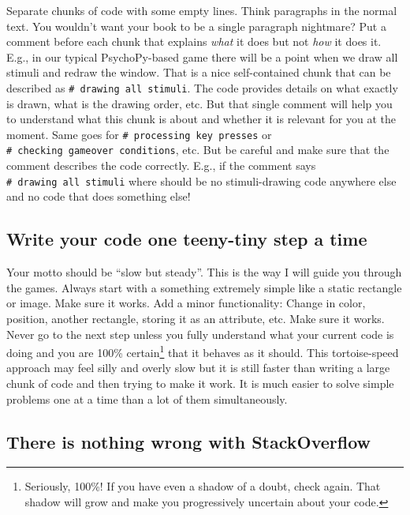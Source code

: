 \documentclass[
]{book}
\begin{document}
Separate chunks of code with some empty lines. Think paragraphs in the normal text. You wouldn't want your book to be a single paragraph nightmare? Put a comment before each chunk that explains \emph{what} it does but not \emph{how} it does it. E.g., in our typical PsychoPy-based game there will be a point when we draw all stimuli and redraw the window. That is a nice self-contained chunk that can be described as \texttt{\#\ drawing\ all\ stimuli}. The code provides details on what exactly is drawn, what is the drawing order, etc. But that single comment will help you to understand what this chunk is about and whether it is relevant for you at the moment. Same goes for \texttt{\#\ processing\ key\ presses} or \texttt{\#\ checking\ gameover\ conditions}, etc. But be careful and make sure that the comment describes the code correctly. E.g., if the comment says \texttt{\#\ drawing\ all\ stimuli} where should be no stimuli-drawing code anywhere else and no code that does something else!

\hypertarget{write-your-code-one-teeny-tiny-step-a-time}{%
\subsection{Write your code one teeny-tiny step a time}\label{write-your-code-one-teeny-tiny-step-a-time}}

Your motto should be ``slow but steady''. This is the way I will guide you through the games. Always start with a something extremely simple like a static rectangle or image. Make sure it works. Add a minor functionality: Change in color, position, another rectangle, storing it as an attribute, etc. Make sure it works. Never go to the next step unless you fully understand what your current code is doing and you are 100\% certain\footnote{Seriously, 100\%! If you have even a shadow of a doubt, check again. That shadow will grow and make you progressively uncertain about your code.} that it behaves as it should. This tortoise-speed approach may feel silly and overly slow but it is still faster than writing a large chunk of code and then trying to make it work. It is much easier to solve simple problems one at a time than a lot of them simultaneously.

\hypertarget{there-is-nothing-wrong-with-stackoverflow}{%
\subsection{There is nothing wrong with StackOverflow}\label{there-is-nothing-wrong-with-stackoverflow}}
\end{document}
